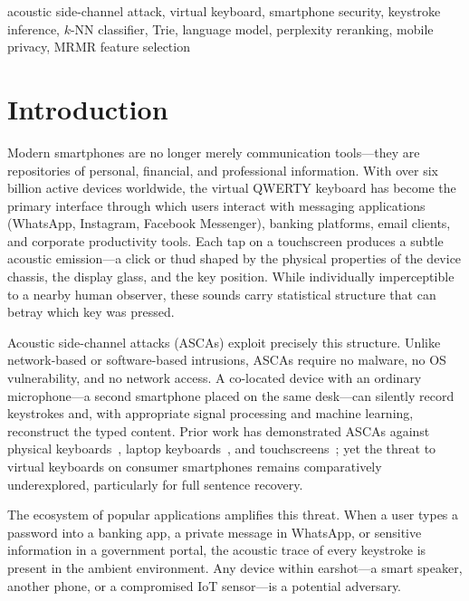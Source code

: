 \documentclass[conference]{IEEEtran}
\begin{document}
\begin{IEEEkeywords}
acoustic side-channel attack, virtual keyboard, smartphone security, keystroke inference, $k$-NN classifier, Trie, language model, perplexity reranking, mobile privacy, MRMR feature selection
\end{IEEEkeywords}

\section{Introduction}

Modern smartphones are no longer merely communication tools---they are repositories of personal, financial, and professional information. With over six billion active devices worldwide, the virtual QWERTY keyboard has become the primary interface through which users interact with messaging applications (WhatsApp, Instagram, Facebook Messenger), banking platforms, email clients, and corporate productivity tools. Each tap on a touchscreen produces a subtle acoustic emission---a click or thud shaped by the physical properties of the device chassis, the display glass, and the key position. While individually imperceptible to a nearby human observer, these sounds carry statistical structure that can betray which key was pressed.

Acoustic side-channel attacks (ASCAs) exploit precisely this structure. Unlike network-based or software-based intrusions, ASCAs require no malware, no OS vulnerability, and no network access. A co-located device with an ordinary microphone---a second smartphone placed on the same desk---can silently record keystrokes and, with appropriate signal processing and machine learning, reconstruct the typed content. Prior work has demonstrated ASCAs against physical keyboards~\cite{asonov2004keyboard, zhuang2009keyboard}, laptop keyboards~\cite{harrison2023}, and touchscreens~\cite{lu2019keylistener}; yet the threat to virtual keyboards on consumer smartphones remains comparatively underexplored, particularly for full sentence recovery.

The ecosystem of popular applications amplifies this threat. When a user types a password into a banking app, a private message in WhatsApp, or sensitive information in a government portal, the acoustic trace of every keystroke is present in the ambient environment. Any device within earshot---a smart speaker, another phone, or a compromised IoT sensor---is a potential adversary.
\end{document}
